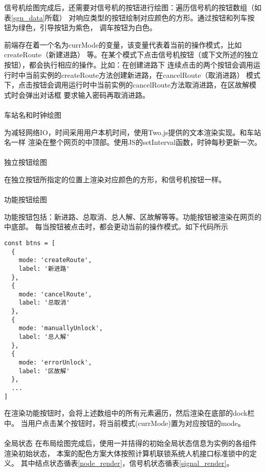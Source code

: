 信号机绘图完成后，还需要对信号机的按钮进行绘图：遍历信号机的按钮数组（如表\ref{sgn_data}所载）
对响应类型的按钮绘制对应颜色的方形。通过按钮和列车按钮为绿色，引导按钮为紫色，
调车按钮为白色。

前端存在着一个名为currMode的变量，该变量代表着当前的操作模式，比如createRoute（新建进路）
等。在某个模式下点击信号机按钮（或下文所述的独立按钮），都会执行相应的操作。比如：在创建进路下
连续点击的两个按钮会调用运行时中当前实例的createRoute方法创建新进路，在cancelRoute（取消进路）
模式下，点击按钮会调用运行时中当前实例的cancelRoute方法取消进路，在区故解模式时会弹出对话框
要求输入密码再取消进路。

\paragraph{}车站名和时钟绘图

为减轻网络IO，时间采用用户本机时间，使用Two.js提供的文本渲染实现。和车站名一样
渲染在整个网页的中顶部。使用JS的setInterval函数\cite{setinterval}，时钟每秒更新一次。

\paragraph{}独立按钮绘图

在独立按钮所指定的位置上渲染对应颜色的方形，和信号机按钮一样。

\paragraph{}功能按钮绘图

功能按钮包括：新进路、总取消、总人解、区故解等等。功能按钮被渲染在网页的中底部。
每当按钮被点击时，都会更动当前的操作模式。如下代码所示
\begin{lstlisting}
const btns = [
  {
    mode: 'createRoute',
    label: '新进路'
  },
  {
    mode: 'cancelRoute',
    label: '总取消'
  },
  {
    mode: 'manuallyUnlock',
    label: '总人解'
  },
  {
    mode: 'errorUnlock',
    label: '区故解'
  },
  ...
]
\end{lstlisting}

在渲染功能按钮时，会将上述数组中的所有元素遍历，然后渲染在底部的dock栏中。
当用户点击某个按钮时，将当前模式(currMode)置为对应按钮的mode。

\paragraph{} 全局状态
在布局绘图完成后，使用一并拮得的初始全局状态信息为实例的各组件渲染初始状态，
本案的配色方案大体按照计算机联锁系统人机接口标准锁中的定义\cite{interlock2019}。
其中结点状态循表\ref{node_render}，信号机状态循表\ref{signal_render}。

